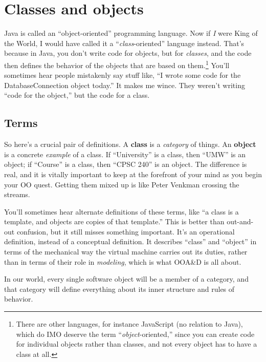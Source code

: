 
\chapter{Classes and objects}
\label{ch:classesObjects}

Java is called an ``object-oriented'' programming language. Now if \textit{I}
were King of the World, I would have called it a ``\textit{class}-oriented''
language instead. That's because in Java, you don't write code for objects,
but for \textit{classes}, and the code then defines the behavior of the
objects that are based on them.\footnote{There are other languages, for
instance JavaScript (no relation to Java), which do IMO deserve the term
``\textit{object}-oriented,'' since you can create code for individual objects
rather than classes, and not every object has to have a class at all.} You'll
sometimes hear people mistakenly say stuff like, ``I wrote some code for the
DatabaseConnection object today.'' It makes me wince. They weren't writing
``code for the object,'' but the code for a class.

\section{Terms}

So here's a crucial pair of definitions. A \textbf{class} is a
\textit{category} of things. An \textbf{object} is a concrete \textit{example}
of a class. If ``University'' is a class, then ``UMW'' is an object; if
``Course'' is a class, then ``CPSC 240'' is an object. The difference is real,
and it is vitally important to keep at the forefront of your mind as you begin
your OO quest. Getting them mixed up is like Peter Venkman crossing the
streams.


You'll sometimes hear alternate definitions of these terms, like ``a class is a
template, and objects are copies of that template.'' This is better than
out-and-out confusion, but it still misses something important. It's an
operational definition, instead of a conceptual definition. It describes
``class'' and ``object'' in terms of the mechanical way the virtual machine
carries out its duties, rather than in terms of their role in
\textit{modeling}, which is what OOA\&D is all about.

In our world, every single software object will be a member of a category,
and that category will define everything about its inner structure and rules
of behavior.

